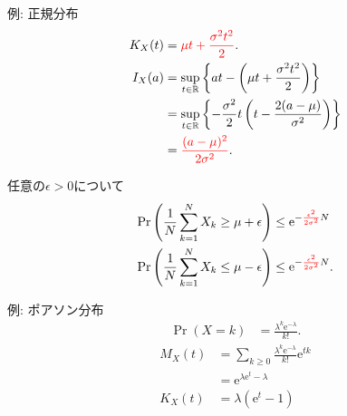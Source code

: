 \documentclass[lualatex,handout]{beamer}
\newcommand{\emm}[1]{\textcolor{red}{#1}}
\theoremstyle{definition}
\begin{document}
\begin{frame}{例: 正規分布}
\begin{align*}
K_X(t) &= \emm{\mu t + \frac{\sigma^2t^2}2}.\\
I_X(a)&=\sup_{t\in\mathbb{R}} \left\{at - \left(\mu t + \frac{\sigma^2t^2}2\right)\right\}\\
&= \sup_{t\in\mathbb{R}} \left\{-\frac{\sigma^2}2 t\left(t-\frac{2(a-\mu)}{\sigma^2}\right) \right\}\\
&=\emm{\frac{(a-\mu)^2}{2\sigma^2}}.
\end{align*}

\vspace{1em}
任意の$\epsilon>0$について
\begin{align*}
\Pr\left(\frac1N\sum_{k=1}^N X_k \ge \mu + \epsilon\right) &\le \mathrm{e}^{-\emm{\frac{\epsilon^2}{2\sigma^2}}N}\\
\Pr\left(\frac1N\sum_{k=1}^N X_k \le \mu - \epsilon\right) &\le \mathrm{e}^{-\emm{\frac{\epsilon^2}{2\sigma^2}}N}.
\end{align*}
\end{frame}

\begin{frame}{例: ポアソン分布}
\begin{align*}
\Pr(X=k) &= \frac{\lambda^k\mathrm{e}^{-\lambda}}{k!}.
\end{align*}
\begin{align*}
M_X(t) &= \sum_{k\ge 0}\frac{\lambda^k\mathrm{e}^{-\lambda}}{k!} \mathrm{e}^{tk}\\
&= \mathrm{e}^{\lambda\mathrm{e}^t - \lambda}\\
K_X(t) &= \lambda(\mathrm{e}^t-1)
\end{align*}
\end{frame}
\end{document}
